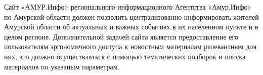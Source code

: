 
Сайт «АМУР.Инфо» регионального информационного Агентства «Амур.Инфо» по Амурской области должен позволить 
централизованно информировать жителей Амурской области об актуальных и важных событиях в их населенном пункте и в целом регионе.
Дополнительной задачей сайта является предоставление его пользователям эргономичного 
доступа  к новостным материалам релевантным для них, 
это должно осуществляться с помощью тематических подборок и поиска материалов по указаным параметрам.

